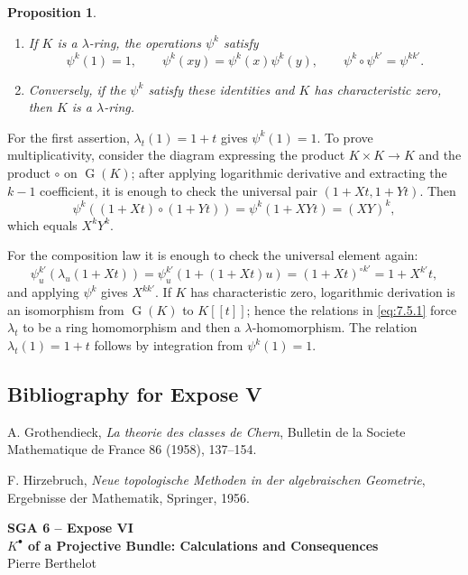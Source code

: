\documentclass[11pt]{article}
\theoremstyle{plain}
\newtheorem{proposition}[theorem]{Proposition}
\theoremstyle{definition}
\theoremstyle{remark}
\providecommand{\Go}{\operatorname{G}}
\begin{document}
\begin{proposition}\label{prop:7.5}
\begin{enumerate}[label=(\roman*)]
\item If $K$ is a $\lambda$-ring, the operations $\psi^k$ satisfy
\begin{equation}\label{eq:7.5.1}
\psi^k(1)=1,
\qquad
\psi^k(xy)=\psi^k(x)\psi^k(y),
\qquad
\psi^k\circ\psi^{k'}=\psi^{kk'}.
\end{equation}
\item Conversely, if the $\psi^k$ satisfy these identities and $K$ has characteristic zero, then $K$ is a $\lambda$-ring.
\end{enumerate}
\end{proposition}

For the first assertion, $\lambda_t(1)=1+t$ gives $\psi^k(1)=1$. To prove multiplicativity, consider the diagram expressing the product $K\times K\to K$ and the product $\circ$ on $\Go(K)$; after applying logarithmic derivative and extracting the $k-1$ coefficient, it is enough to check the universal pair $(1+Xt,1+Yt)$. Then
\[
\psi^k((1+Xt)\circ(1+Yt))=\psi^k(1+XYt)=(XY)^k,
\]
which equals $X^kY^k$.

For the composition law it is enough to check the universal element again:
\[
\psi^{k'}_u(\lambda_u(1+Xt))=\psi^{k'}_u(1+(1+Xt)u)=(1+Xt)^{\circ k'}=1+X^{k'}t,
\]
and applying $\psi^k$ gives $X^{kk'}$. If $K$ has characteristic zero, logarithmic derivation is an isomorphism from $\Go(K)$ to $K[[t]]$; hence the relations in \eqref{eq:7.5.1} force $\lambda_t$ to be a ring homomorphism and then a $\lambda$-homomorphism. The relation $\lambda_t(1)=1+t$ follows by integration from $\psi^k(1)=1$.

\subsection*{Bibliography for Expose V}
\begin{enumerate}[label={[\arabic*]}]
\item A. Grothendieck, \emph{La theorie des classes de Chern}, Bulletin de la Societe Mathematique de France 86 (1958), 137--154.
\item F. Hirzebruch, \emph{Neue topologische Methoden in der algebraischen Geometrie}, Ergebnisse der Mathematik, Springer, 1956.
\end{enumerate}

\clearpage

\begin{center}
{\Large\textbf{SGA 6 -- Expose VI}}\\[0.35em]
{\large\textbf{$K^{\bullet}$ of a Projective Bundle: Calculations and Consequences}}\\[0.25em]
{\large Pierre Berthelot}
\end{center}
\end{document}
